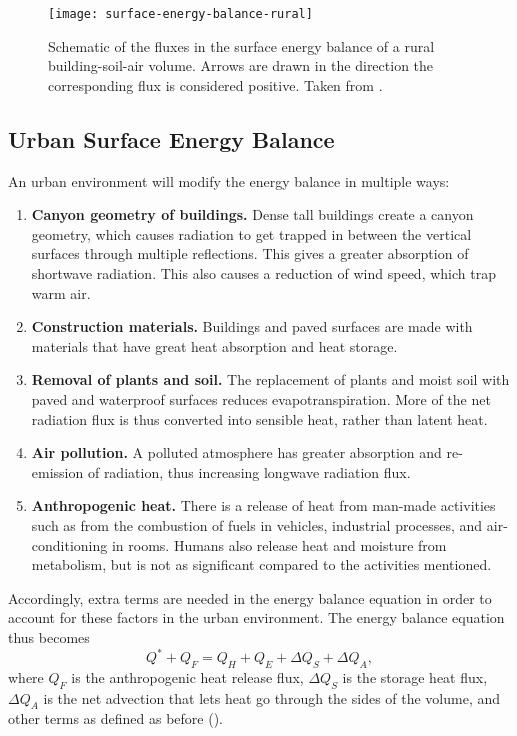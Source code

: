 		\begin{figure}	
			\centering
			\texttt{[image: surface-energy-balance-rural]}
			\caption{
				Schematic of the fluxes in the surface energy balance of a rural building-soil-air volume. 
				Arrows are drawn in the direction the corresponding flux is considered positive.
				Taken from \textcite{Oke2017urban}.
			}
			\label{fig:surface-energy-balance-rural}
		\end{figure}
		

	\subsection{Urban Surface Energy Balance}

		An urban environment will modify the energy balance in multiple ways:
		\begin{enumerate}
			\item \textbf{Canyon geometry of buildings.}
			Dense tall buildings create a canyon geometry,
				which causes radiation to get trapped in between the vertical surfaces through multiple reflections.
			This gives a greater absorption of shortwave radiation.
			This also causes a reduction of wind speed, which trap warm air.
			
			\item \textbf{Construction materials.}
			Buildings and paved surfaces are made with materials that have great heat absorption and heat storage.
			
			\item \textbf{Removal of plants and soil.}
			The replacement of plants and moist soil with paved and waterproof surfaces reduces evapotranspiration.
			More of the net radiation flux is thus converted into sensible heat, rather than latent heat.
			
			\item \textbf{Air pollution.}
			A polluted atmosphere has greater absorption and re-emission of radiation, thus increasing longwave radiation flux.
			
			\item \textbf{Anthropogenic heat.}
			There is a release of heat from man-made activities such as from
				the combustion of fuels in vehicles,
				industrial processes, and
				air-conditioning in rooms.
			Humans also release heat and moisture from metabolism, but is not as significant compared to the activities mentioned.
		\end{enumerate}
	
		Accordingly, extra terms are needed in the energy balance equation in order to account for these factors in the urban environment.
		The energy balance equation thus becomes
		\begin{equation}
			Q^* + Q_F= Q_H + Q_E + \Delta Q_S + \Delta Q_A,
		\end{equation}
		where $Q_F$ is the anthropogenic heat release flux,
		$\Delta Q_S$ is the storage heat flux,
		$\Delta Q_A$ is the net advection that lets heat go through the sides of the volume, and
		other terms as defined as before (\cite{Oke1988}).
		
